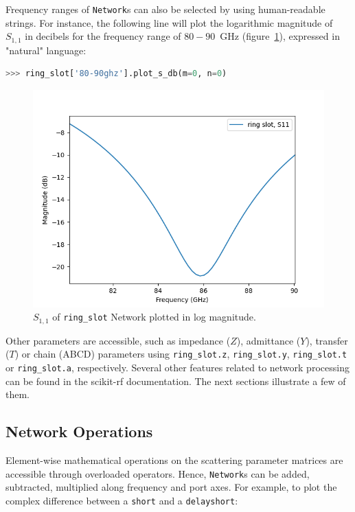 \documentclass{IEEEjmw}
\begin{document}
Frequency ranges of \texttt{Network}s can also be selected by using human-readable strings. For instance, the following line will plot the logarithmic magnitude of $S_{1,1}$ in decibels for the frequency range of $80-90$~GHz (figure~\ref{fig:figure2}), expressed in "natural" language:

\begin{lstlisting}[language=Python]
>>> ring_slot['80-90ghz'].plot_s_db(m=0, n=0)
\end{lstlisting}

\begin{figure}
	\centering
	\includegraphics[width=0.95\linewidth]{figures/figure2}
	\caption{$S_{1,1}$ of \texttt{ring\_slot} Network plotted in log magnitude.}
	\label{fig:figure2}
\end{figure}

Other parameters are accessible, such as impedance ($Z$), admittance ($Y$), transfer ($T$) or chain (ABCD) parameters using \texttt{ring\_slot.z}, \texttt{ring\_slot.y}, \texttt{ring\_slot.t} or \texttt{ring\_slot.a}, respectively. Several other features related to network processing can be found in the scikit-rf documentation. The next sections illustrate a few of them. 

\subsection{Network Operations}
Element-wise mathematical operations on the scattering parameter matrices are accessible through overloaded operators. Hence, \texttt{Network}s can be added, subtracted, multiplied along frequency and port axes. For example, to plot the complex difference between a \texttt{short} and a \texttt{delayshort}:
\end{document}
